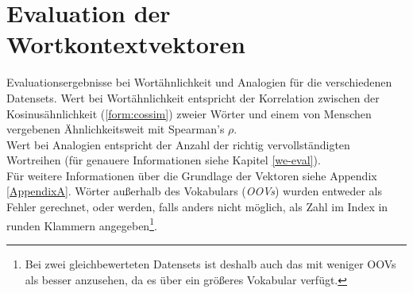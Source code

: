 
\chapter{Evaluation der Wortkontextvektoren} %

\label{AppendixB} %

Evaluationsergebnisse bei Wortähnlichkeit und Analogien für die verschiedenen Datensets.
Wert bei Wortähnlichkeit entspricht der Korrelation zwischen der Kosinusähnlichkeit (\ref{form:cossim}) zweier Wörter und
einem von Menschen vergebenen Ähnlichkeitsweit mit Spearman's $\rho$.\\
Wert bei Analogien entspricht der Anzahl der richtig vervollständigten Wortreihen (für genauere Informationen siehe
Kapitel \ref{we-eval}).\\
Für weitere Informationen über die Grundlage der Vektoren siehe Appendix \ref{AppendixA}.
Wörter außerhalb des Vokabulars (\emph{OOVs}) wurden entweder als Fehler gerechnet, oder
werden, falls anders nicht möglich, als Zahl im Index in runden Klammern angegeben\footnote{Bei zwei gleichbewerteten
Datensets ist deshalb auch das mit weniger OOVs als besser anzusehen, da es über ein größeres Vokabular verfügt.}.

